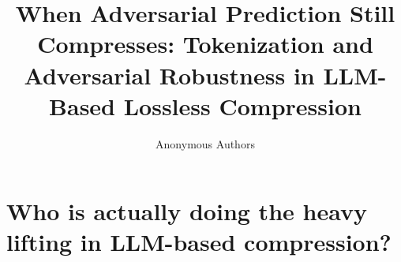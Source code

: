 \documentclass{article}
\title{When Adversarial Prediction Still Compresses: Tokenization and Adversarial Robustness in LLM-Based Lossless Compression}
\author{Anonymous Authors}
\begin{document}
\maketitle










%





%










\section{Who is actually doing the heavy lifting in LLM-based compression?}
\end{document}
